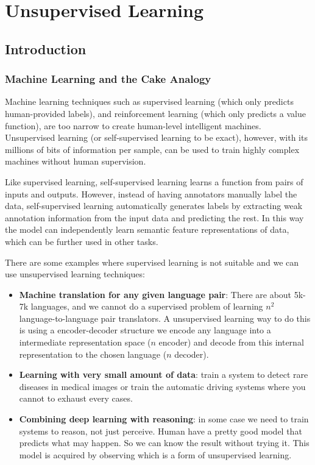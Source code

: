 \chapter{Unsupervised Learning}

\section{Introduction}

\subsection{Machine Learning and the Cake Analogy}

Machine learning techniques such as supervised learning (which only predicts human-provided labels), and reinforcement learning (which only predicts a value function), are too narrow to create human-level intelligent machines. Unsupervised learning (or self-supervised learning to be exact), however, with its millions of bits of information per sample, can be used to train highly complex machines without human supervision.

Like supervised learning, self-supervised learning learns a function from pairs of inputs and outputs. However, instead of having annotators manually label the data, self-supervised learning automatically generates labels by extracting weak annotation information from the input data and predicting the rest. In this way the model can independently learn semantic feature representations of data, which can be further used in other tasks.

There are some examples where supervised learning is not suitable and we can use unsupervised learning techniques:
\begin{itemize}
    \item \textbf{Machine translation for any given language pair}: There are about 5k-7k languages, and we cannot do a supervised problem of learning $n^2$ language-to-language pair translators. A unsupervised learning way to do this is using a encoder-decoder structure we encode any language into a intermediate representation space ($n$ encoder) and decode from this internal representation to the chosen language ($n$ decoder).

    \item \textbf{Learning with very small amount of data}: train a system to detect rare diseases in medical images or train the automatic driving systems where you cannot to exhaust every cases.

    \item \textbf{Combining deep learning with reasoning}: in some case we need to train systems to reason, not just perceive. Human have a pretty good model that predicts what may happen. So we can know the result without trying it. This model is acquired by observing which is a form of unsupervised learning.
\end{itemize}

